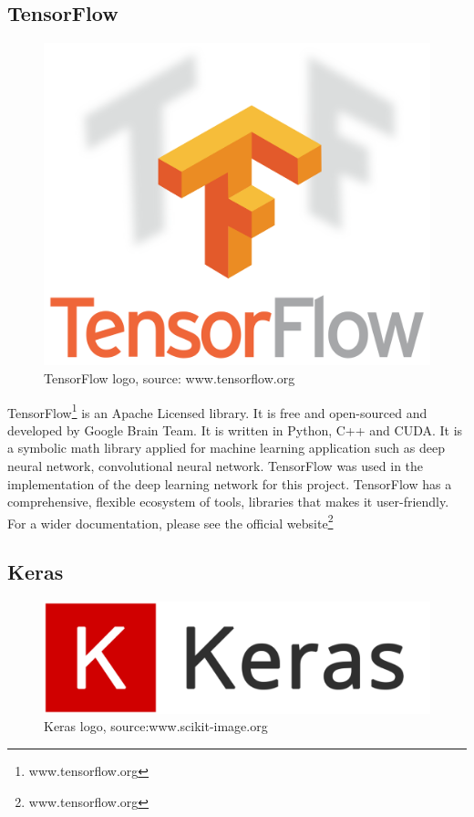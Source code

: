 \subsection{ TensorFlow}
\begin{figure}[H]
    \centering
    \includegraphics[width=0.7\linewidth]{images/TensorFlow.png}
     \caption{TensorFlow logo, source: www.tensorflow.org}
  \end{figure}
TensorFlow\footnote{www.tensorflow.org} is an Apache Licensed library. It is free and open-sourced and developed by Google Brain Team. It is written in Python, C++ and CUDA. It is a symbolic math library applied for machine learning application such as deep neural network, convolutional neural network. TensorFlow was used in the implementation of the deep learning network for this project. TensorFlow has a comprehensive, flexible ecosystem of tools, libraries that makes it user-friendly.
For a wider documentation, please see the official website\footnote{www.tensorflow.org}
\clearpage

\subsection{Keras}
\begin{figure}[H]
    \centering
    \includegraphics[width=0.9\linewidth]{images/keras.png}
     \caption{Keras logo, source:www.scikit-image.org}
  \end{figure}

